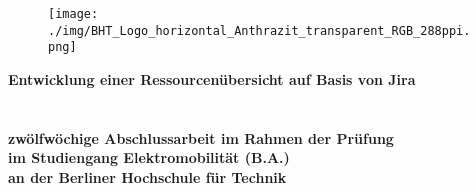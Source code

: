 \thispagestyle{empty}
\begin{titlepage}
	 \thispagestyle{empty}
\begin{center}
	 \thispagestyle{empty}
\begin{figure}[t]
	\centering
	\texttt{[image: ./img/BHT\_Logo\_horizontal\_Anthrazit\_transparent\_RGB\_288ppi.png]}
	
\end{figure}

$~~$\\
\textbf{\huge Entwicklung einer Ressourcenübersicht auf Basis von Jira}\paragraph{}$~~$\\
\paragraph{}$~~$\\
\textbf{zwölfwöchige Abschlussarbeit im Rahmen der Prüfung}\\ \textbf{im Studiengang Elektromobilität (B.A.)}\\ \textbf{an der Berliner Hochschule für Technik}
\paragraph{}$~~$\\
\\
\\
\\
\\
\\

\end{center}
\end{titlepage}
